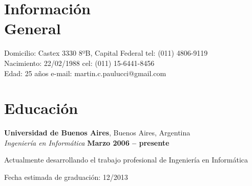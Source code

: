 \documentclass[margin,line]{resume}
\begin{document}
\begin{resume}

    \section{\mysidestyle Información \\General}

    Domicilio: Castex 3330 8ºB, Capital Federal                            \hfill tel: (011) 4806-9119         \vspace{0mm}\\\vspace{0mm}%
    Nacimiento: 22/02/1988                          \hfill cel: (011) 15-6441-8456         \vspace{0mm}\\\vspace{0mm}%
    Edad: 25 años      \hfill e-mail: martin.c.paulucci@gmail.com  \vspace{0mm}\\\vspace{-4.5mm}%

    \section{\mysidestyle Educación}

    \textbf{Universidad de Buenos Aires}, Buenos Aires, Argentina \vspace{2mm}\\\vspace{1mm}%
    \textsl{Ingeniería en Informática} \hfill \textbf{ Marzo 2006 -- presente}\vspace{-3mm}\\\vspace{-1mm}%
    \begin{list2}
        \item Actualmente desarrollando el trabajo profesional de Ingeniería en Informática
        \item Fecha estimada de graduación: 12/2013
    \end{list2}\vspace{-1.5mm}


\end{resume}
\end{document}
